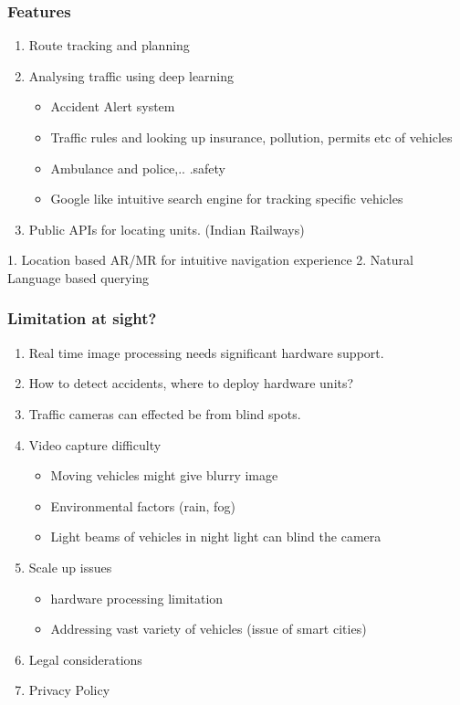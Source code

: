 \documentclass{beamer}
\begin{document}
\begin{frame}
	\frametitle{Features}
	\begin{enumerate}
		\item Route tracking and planning
		\item Analysing traffic using deep learning
		\begin{itemize}
		    \item Accident Alert system
		    \item Traffic rules and looking up insurance, pollution, permits etc of vehicles
		    \item Ambulance and police,.. .safety
		    \item Google like intuitive search engine for tracking specific vehicles
		\end{itemize}
		\item Public APIs for locating units. (Indian Railways)
	\end{enumerate}
\end{frame}

1. Location based AR/MR for intuitive navigation experience  
2. Natural Language based querying

\begin{frame}
	\frametitle{Limitation at sight?}
	\begin{enumerate}
		\item Real time image processing needs significant hardware support.	
		\item How to detect accidents, where to deploy hardware units?
		\item Traffic cameras can effected be from blind spots.
		\item Video capture difficulty
		\begin{itemize}
			\item Moving vehicles might give blurry image
			\item Environmental factors (rain, fog)
			\item Light beams of vehicles in night light can blind the camera
		\end{itemize}
		\item Scale up issues
		\begin{itemize}
			\item hardware processing limitation
			\item Addressing vast variety of vehicles (issue of smart cities)	
		\end{itemize}
		\item Legal considerations
		\item Privacy Policy
	\end{enumerate}
\end{frame}
\end{document}

